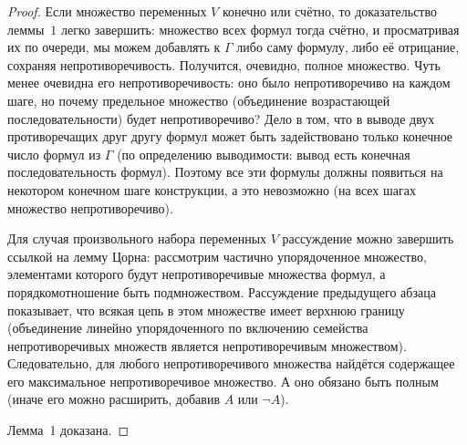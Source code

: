 \begin{proof}
Если множество переменных $V$ конечно или счётно, то
доказательство леммы~$1$ легко завершить: множество всех формул
тогда счётно, и просматривая их по очереди, мы можем добавлять к
$\Gamma$ либо саму формулу, либо её отрицание, сохраняя
непротиворечивость. Получится, очевидно, полное множество.
Чуть менее очевидна его непротиворечивость: оно было
непротиворечиво на каждом шаге, но почему предельное
множество (объединение возрастающей последовательности)
будет непротиворечиво? Дело в том, что в выводе двух
противоречащих друг другу формул может быть задействовано
только конечное число формул из $\Gamma$ (по определению
выводимости: вывод есть конечная последовательность формул).
Поэтому все эти формулы должны появиться на некотором
конечном шаге конструкции, а это невозможно (на всех
шагах множество непротиворечиво).

Для случая произвольного набора переменных $V$ рассуждение можно
завершить ссылкой на лемму Цорна:%
%
рассмотрим частично
упорядоченное множество, элементами которого будут
непротиворечивые множества формул, а порядком\т отношение 
быть подмножеством. Рассуждение предыдущего абзаца
показывает, что всякая цепь в этом множестве имеет верхнюю
границу (объединение линейно упорядоченного по включению
семейства непротиворечивых множеств является непротиворечивым
множеством). Следовательно, для любого непротиворечивого
множества найдётся содержащее его максимальное непротиворечивое
множество. А оно обязано быть полным (иначе его можно расширить,
добавив $A$ или $\lnot A$).

Лемма~1 доказана.


\end{proof}
